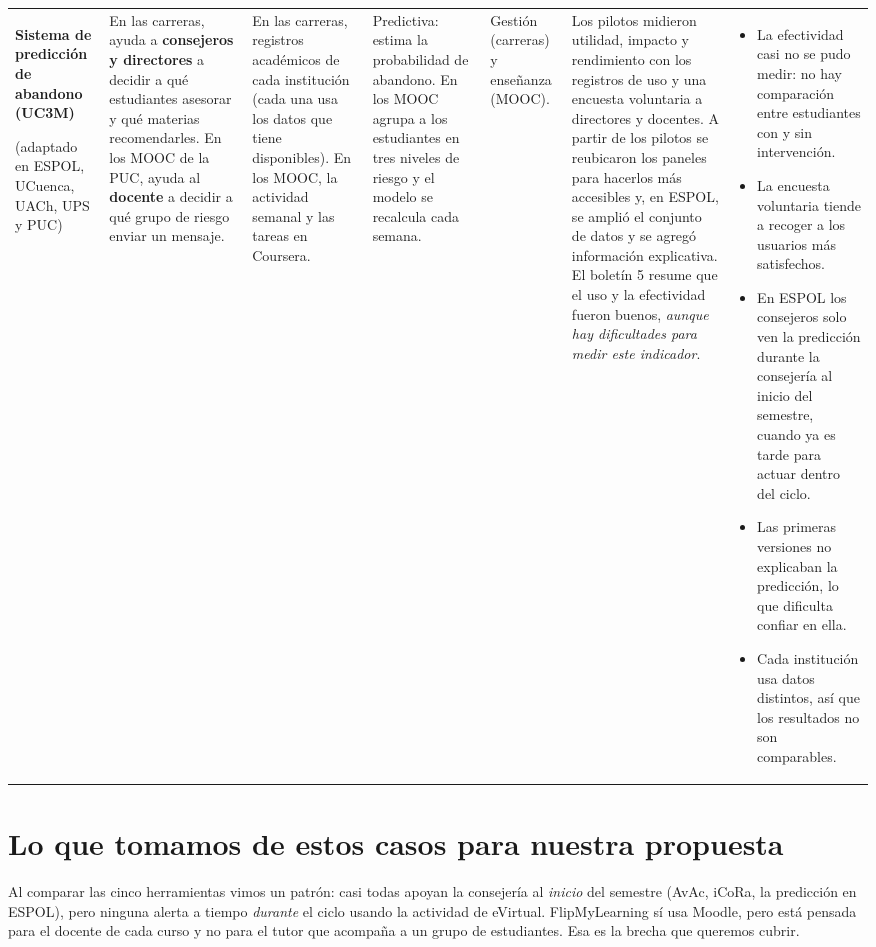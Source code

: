 \documentclass[10pt]{article}
\begin{document}
{\begin{longtable}{P{2.2cm} P{3.4cm} P{3.6cm} P{2.7cm} P{2.2cm} P{4.3cm} P{5.0cm}}
\textbf{Sistema de predicción de abandono (UC3M)}\par (adaptado en ESPOL, UCuenca, UACh, UPS y PUC)
& En las carreras, ayuda a \textbf{consejeros y directores} a decidir a qué estudiantes asesorar y qué materias recomendarles. En los MOOC de la PUC, ayuda al \textbf{docente} a decidir a qué grupo de riesgo enviar un mensaje.
& En las carreras, registros académicos de cada institución (cada una usa los datos que tiene disponibles). En los MOOC, la actividad semanal y las tareas en Coursera.
& Predictiva: estima la probabilidad de abandono. En los MOOC agrupa a los estudiantes en tres niveles de riesgo y el modelo se recalcula cada semana.
& Gestión (carreras) y enseñanza (MOOC).
& Los pilotos midieron utilidad, impacto y rendimiento con los registros de uso y una encuesta voluntaria a directores y docentes. A partir de los pilotos se reubicaron los paneles para hacerlos más accesibles y, en ESPOL, se amplió el conjunto de datos y se agregó información explicativa. El boletín 5 resume que el uso y la efectividad fueron buenos, \emph{aunque hay dificultades para medir este indicador}.
& \begin{itemize}
\item La efectividad casi no se pudo medir: no hay comparación entre estudiantes con y sin intervención.
\item La encuesta voluntaria tiende a recoger a los usuarios más satisfechos.
\item En ESPOL los consejeros solo ven la predicción durante la consejería al inicio del semestre, cuando ya es tarde para actuar dentro del ciclo.
\item Las primeras versiones no explicaban la predicción, lo que dificulta confiar en ella.
\item Cada institución usa datos distintos, así que los resultados no son comparables.
\end{itemize}\\
\end{longtable}
}

\section*{Lo que tomamos de estos casos para nuestra propuesta}

Al comparar las cinco herramientas vimos un patrón: casi todas apoyan la consejería al \emph{inicio} del semestre (AvAc, iCoRa, la predicción en ESPOL), pero ninguna alerta a tiempo \emph{durante} el ciclo usando la actividad de eVirtual. FlipMyLearning sí usa Moodle, pero está pensada para el docente de cada curso y no para el tutor que acompaña a un grupo de estudiantes. Esa es la brecha que queremos cubrir.
\end{document}
